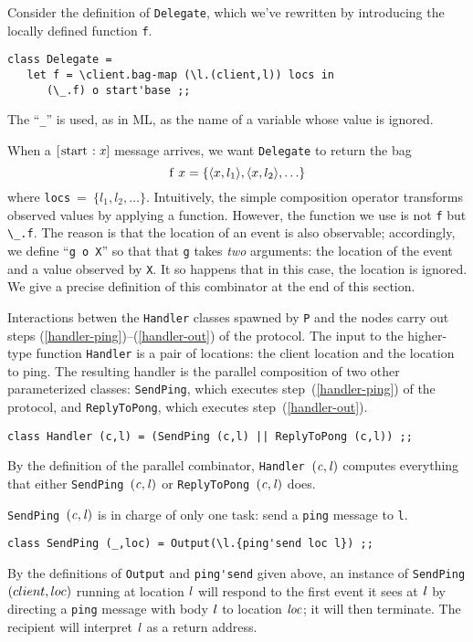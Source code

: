 \documentclass[final]{article}
\newcommand{\listinline}[1]{\text{\lstinline{#1}}}
\newcommand{\msg}[2]{\ensuremath{[\listinline{#1}:\NUPRL{#2}]}}
\begin{document}
Consider the definition of \lstinline{Delegate}, which we've rewritten
by introducing the locally defined function \lstinline{f}.
\begin{lstlisting}
class Delegate =
   let f = \client.bag-map (\l.(client,l)) locs in
      (\_.f) o start'base ;;
\end{lstlisting}
The ``\lstinline{_}'' is used, as in ML, as the name of a variable
whose value is ignored.

When a \msg{start}{x} message arrives, we want \lstinline{Delegate} to
return the bag
\[
\listinline{f}~x = \{\NUPRLpair{x}{l_1}, \NUPRLpair{x}{l_2}, \ldots\}
\]
where \lstinline{locs}~=~$\{l_1, l_2,\ldots\}$.  Intuitively, 
the simple composition operator %
%
%
transforms observed values by applying a function.  However, the
function we use is not \lstinline{f} but \lstinline{\_.f}.  The reason
is that the location of an event is also observable; accordingly, we
define ``\lstinline{g o X}'' so that that \lstinline{g} takes
\emph{two} arguments: the location of the event and a value observed
by \lstinline{X}.  It so happens that in this case, the location is
ignored.  We give a precise definition of this combinator at the end
of this section.

\noindent
{}

Interactions betwen the \lstinline{Handler} classes spawned by
\lstinline{P} and the nodes carry out steps
(\ref{handler-ping})--(\ref{handler-out}) of the protocol.  The input
to the higher-type function \lstinline{Handler} is a pair of
locations: the client location and the location to ping.  The
resulting handler is the parallel composition of two other
parameterized classes: \lstinline{SendPing}, which executes
step~(\ref{handler-ping}) of the protocol, and
\lstinline{ReplyToPong}, which executes step~(\ref{handler-out}).

\begin{emlcode}
\begin{lstlisting}
class Handler (c,l) = (SendPing (c,l) || ReplyToPong (c,l)) ;;
\end{lstlisting}
\end{emlcode}
By the definition of the parallel combinator,
\lstinline{Handler}~$\mathit{(c,l)}$ computes everything that either
\lstinline{SendPing}~$\mathit{(c,l)}$ or
  \lstinline{ReplyToPong}~$\mathit{(c,l)}$ does.

\lstinline{SendPing}~$\mathit{(c,l)}$ is in charge of only one task:
  send a \lstinline{ping} message to \lstinline{l}.
\begin{emlcode}
\begin{lstlisting}
class SendPing (_,loc) = Output(\l.{ping'send loc l}) ;;
\end{lstlisting}
\end{emlcode}
By the definitions of \lstinline{Output} and \lstinline{ping'send}
given above, an instance of \lstinline{SendPing}$\mathit{(}client,loc)$%
%
%
%
running at location $\mathit{l}$ will respond to the first event it
sees at $\mathit{l}$ by directing a \lstinline{ping}
message with body $\mathit{l}$ to location $\mathit{loc}$; it will then
terminate.  The recipient will interpret $\mathit{l}$ as a return
address.
%
\end{document}
